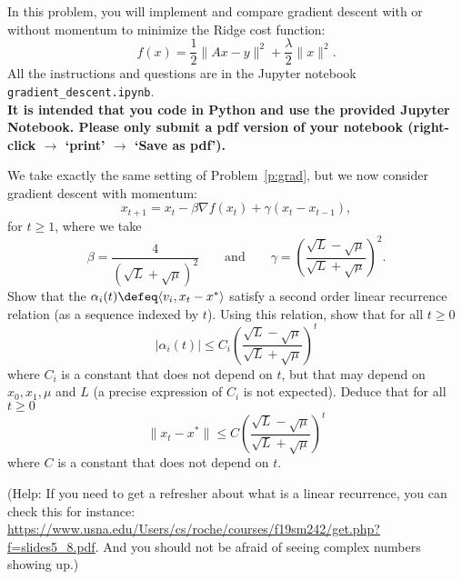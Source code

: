 \documentclass[11pt,nocut]{article}
\begin{document}
\vspace{5mm}

\begin{problem}[3 points]
	In this problem, you will implement and compare gradient descent with or without momentum to minimize the Ridge cost function:
	$$
	f(x) = \frac{1}{2} \|Ax-y\|^2 + \frac{\lambda}{2} \|x\|^2.
	$$
	All the instructions and questions are in the Jupyter notebook \texttt{gradient\_descent.ipynb}.
	\\

	\textbf{It is intended that you code in Python and use the provided Jupyter Notebook. Please only submit a pdf version of your notebook (right-click $\to$ `print' $\to$ `Save as pdf').}
\end{problem}


\vspace{5mm}

\begin{problem}[$\star$]
	We take exactly the same setting of Problem~\ref{p:grad}, but we now consider gradient descent with momentum:
$$
x_{t+1} = x_t - \beta \nabla f(x_t) + \gamma(x_t -x_{t-1}),
$$
for $t \geq 1$,
where we take
$$
\beta = \frac{4}{(\sqrt{L} + \sqrt{\mu})^2}
\qquad \text{and} \qquad
\gamma = \left(\frac{\sqrt{L}-\sqrt{\mu}}{\sqrt{L}+\sqrt{\mu}}\right)^{\! 2}.
$$
Show that the $\alpha_i(t) \defeq \langle v_i, x_t - x^* \rangle$ satisfy a second order linear recurrence relation (as a sequence indexed by $t$). Using this relation, show that for all $t \geq 0$
$$
|\alpha_i(t)| \leq C_i \left(\frac{\sqrt{L}-\sqrt{\mu}}{\sqrt{L} + \sqrt{\mu}}\right)^{\! t}
$$
where $C_i$ is a constant that does not depend on $t$, but that may depend on $x_0,x_1, \mu$ and $L$ (a precise expression of $C_i$ is not expected). Deduce that for all $t \geq 0$
$$
\|x_t - x^*\| \leq C \left(\frac{\sqrt{L}-\sqrt{\mu}}{\sqrt{L} + \sqrt{\mu}}\right)^{\! t}
$$
where $C$ is a constant that does not depend on $t$.
\end{problem}

(Help: If you need to get a refresher about what is a linear recurrence, you can check this for instance:
\url{https://www.usna.edu/Users/cs/roche/courses/f19sm242/get.php?f=slides5_8.pdf}. And you should not be afraid of seeing complex numbers showing up.)


%
%
\end{document}
